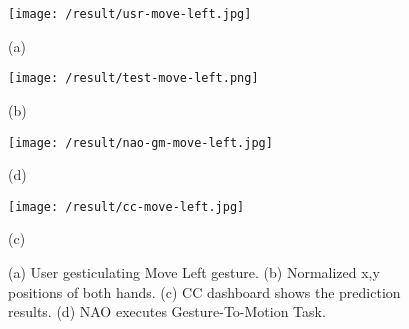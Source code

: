 \begin{figure}
	[h] 
	\begin{minipage}
		{0.3 
		\textwidth} 
		\texttt{[image: /result/usr-move-left.jpg]} \caption*{(a)} 
	\end{minipage}
	\begin{minipage}
		{0.7
			\textwidth} 
		\texttt{[image: /result/test-move-left.png]} \caption*{(b)} 
	\end{minipage}
	\begin{minipage}
		{0.3
		\textwidth}
		\texttt{[image: /result/nao-gm-move-left.jpg]} \caption*{(d)} 
	\end{minipage}
	\begin{minipage}
		{0.7
			\textwidth}
		\texttt{[image: /result/cc-move-left.jpg]}	\caption*{(c)} 
	\end{minipage}
	\caption{(a) User gesticulating Move Left gesture. (b) Normalized x,y positions of both hands. (c) CC dashboard shows the prediction results. (d) NAO executes Gesture-To-Motion Task.} \label{res:gm:move-left} 
\end{figure}